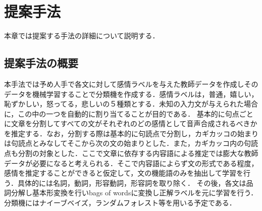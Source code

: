 \chapter{提案手法}

本章では提案する手法の詳細について説明する．

\section{提案手法の概要}
本手法では予め人手で各文に対して感情ラベルを与えた教師データを作成しそのデータを機械学習することで分類機を作成する．感情ラベルは，普通，嬉しい，恥ずかしい，怒ってる，悲しいの５種類とする．未知の入力文が与えられた場合に，この中の一つを自動的に割り当てることが目的である．
基本的に句点ごとに文章を分割してすべての文がそれぞれのどの感情として音声合成されるべきかを推定する．なお，分割する際は基本的に句読点で分割し，カギカッコの始まりは句読点とみなしてそこから次の文の始まりとした．また，カギカッコ内の句読点も分割の対象とした．ここで文章に依存する内容語による推定では膨大な教師データが必要になると考えられる．そこで内容語によらず文の形式である程度，感情を推定することができると仮定して，文の機能語のみを抽出して学習を行う．具体的には名詞，動詞，形容動詞，形容詞を取り除く．
その後，各文は品詞分解し基本形変換を行いbags of wordsに変換し正解ラベルを元に学習を行う．分類機にはナイーブベイズ，ランダムフォレスト等を用いる予定である．

